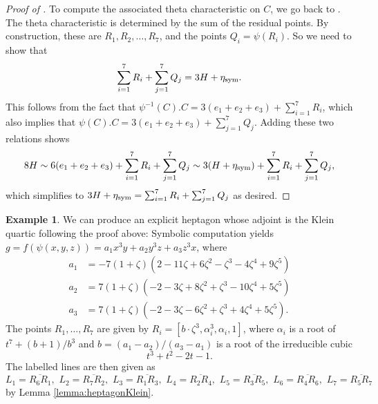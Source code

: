 \documentclass[12pt]{article}
\numberwithin{equation}{section}
\theoremstyle{definition}
\newtheorem{example}[theorem]{Example}
\newcommand{\etasym}{\eta_{\rm sym}}
\newcommand{\ol}{\overline}
\begin{document}
\begin{proof}[{Proof of }]
	To compute the associated theta characteristic on $C$, we go back to .
	The theta characteristic is determined by the sum of the residual points. By construction, these are $R_1,R_2,\ldots,R_7$, and the points $Q_i = \psi(R_i)$. So we need to show that 
	\[ \sum_{i=1}^7 R_i + \sum_{j=1}^7 Q_j = 3H + \etasym. \]
	This follows from the fact that $\psi^{-1}(C).C = 3(e_1 + e_2 + e_3) + \sum_{i=1}^7 R_i$, which also implies that $\psi(C).C = 3(e_1 + e_2 + e_3) + \sum_{j=1}^7 Q_j$. Adding these two relations shows
	\[ 8 H \sim 6(e_1 + e_2 + e_3) + \sum_{i=1}^7 R_i + \sum_{j=1}^7 Q_j \sim 3 (H + \etasym) + \sum_{i=1}^7 R_i + \sum_{j=1}^7 Q_j, \]
	which simplifies to $3H + \etasym = \sum_{i=1}^7 R_i + \sum_{j=1}^7 Q_j$ as desired.
\end{proof}

\begin{example}\label{example:KleinHeptagon}
	We can produce an explicit heptagon whose adjoint is the Klein quartic following the proof above: Symbolic computation yields $g=f\left(\psi(x,y,z)\right)=a_1 x^3 y + a_2 y^3 z+ a_3 z^3 x$, where
	\begin{align*}
		a_1 &= -7 \left(1+\zeta\right)\left(2-11 \zeta+6 \zeta^2-\zeta^3-4 \zeta^4+9 \zeta^5\right)\\
		a_2 &= 7 \left(1+\zeta\right)\left(-2-3 \zeta+8 \zeta^2+\zeta^3-10 \zeta^4+5 \zeta^5\right)\\
		a_3 &= 7 \left(1+\zeta\right)\left(-2-3 \zeta-6 \zeta^2+\zeta^3+4 \zeta^4+5 \zeta^5\right).
	\end{align*}
	The points $R_1,\dots,R_7$ are given by $R_i=[b\cdot\zeta^3,\alpha_i^3,\alpha_i,1]$, where 
	$\alpha_i$ is a root of $t^7+(b+1)/b^3$ and $b=(a_1-a_2)/(a_3-a_1)$ is a root of the irreducible cubic
	\[
	   t^3+t^2-2t-1.	
	\]
	The labelled lines are then given as
	\[ L_1 = \ol{R_6R_1},\,\, L_2 = \ol{R_7R_2}, \,\, L_3 = \ol{R_1R_3}, \,\, L_4 = \ol{R_2R_4}, \,\, L_5 = \ol{R_3R_5}, \,\, L_6 = \ol{R_4R_6}, \,\, L_7 = \ol{R_5R_7} 
	\]
	by Lemma \ref{lemma:heptagonKlein}.


\end{example}
\end{document}
